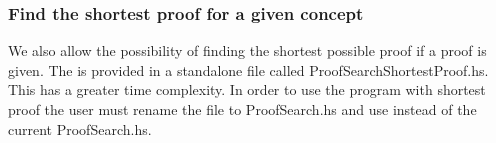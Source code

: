 \subsubsection*{Find the shortest proof for a given concept}
We also allow the possibility of finding the shortest possible proof if a proof is given. The is provided in a standalone file called ProofSearchShortestProof.hs. This has a greater time complexity. In order to use the program with shortest proof the user must rename the file to ProofSearch.hs and use instead of the current ProofSearch.hs. 








